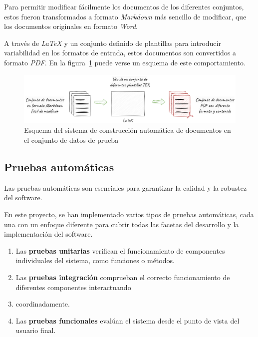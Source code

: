 Para permitir modificar fácilmente los documentos de los diferentes conjuntos, estos fueron transformados a formato
\textit{Markdown} más sencillo de modificar, que los documentos originales en formato \textit{Word}.

A través de \textit{LaTeX} y un conjunto definido de plantillas para introducir variabilidad en los formatos de
entrada, estos documentos son convertidos a formato \textit{PDF}.
En la figura~\ref{fig:chapter_4.5.dataset_construction_overview} puede verse un esquema de este comportamiento.

\begin{figure}[ht]
    \begin{center}
        \includegraphics[width=\textwidth]{./chapter/4/images/chapter_4.5.dataset_construction_overview}
        \caption{Esquema del sistema de construcción automática de documentos en el conjunto de datos de prueba}
        \label{fig:chapter_4.5.dataset_construction_overview}
    \end{center}
\end{figure}

\subsection*{Pruebas automáticas}

Las pruebas automáticas son esenciales para garantizar la calidad y la robustez del software.

En este proyecto, se han implementado varios tipos de pruebas automáticas, cada una con un enfoque diferente para cubrir
todas las facetas del desarrollo y la implementación del software.

\begin{enumerate}
    \item
    Las \textbf{pruebas unitarias} verifican el funcionamiento de componentes individuales del sistema, como funciones
    o métodos.

    \item
    Las \textbf{pruebas integración} comprueban el correcto funcionamiento de diferentes componentes interactuando
    \item coordinadamente.

    \item
    Las \textbf{pruebas funcionales} evalúan el sistema desde el punto de vista del usuario final.
\end{enumerate}

